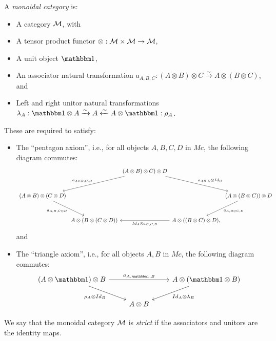 \begin{dfn}
	A \emph{monoidal category} is:
	\begin{itemize}
		\item A category $\mathcal{M}$, with
		\item A tensor product functor $\otimes: \mathcal{M} \times \mathcal{M} \to \mathcal{M}$,
		\item A unit object $\onebb$,
		\item An associator natural transformation $a_{A,B,C}:(A \otimes B) \otimes C \xrightarrow{\sim} A \otimes (B \otimes C)$, and
		\item Left and right unitor natural transformations $\lambda_A:\onebb \otimes A \xrightarrow{\sim} A \xleftarrow{\sim} A \otimes \onebb:\rho_A$.
	\end{itemize}
	These are required to satisfy:
	\begin{itemize}
		\item The ``pentagon axiom'', i.e., for all objects $A,B,C,D$ in $Mc$, the following diagram commutes:
		\begin{equation*}
            \begin{tikzcd}[column sep=0ex, row sep = large]
                &&(A\otimes B)\otimes C)\otimes D \arrow[dll, "a_{A\otimes B,C,D}"'] \arrow[drr, "a_{A B,C}\otimes Id_D"] \\
                (A\otimes B)\otimes(C\otimes D)\arrow[dr, "a_{A,B,C\otimes D}"']
                &&&&(A\otimes(B\otimes C))\otimes D \arrow[dl, "a_{A,B\otimes C,D}"] \\
                &A\otimes (B\otimes(C\otimes D))
                &&A\otimes ((B\otimes C)\otimes D)\arrow[ll, "Id_A\otimes a_{B,C,D}"],
            \end{tikzcd}
        \end{equation*}		
		and
		\item The ``triangle axiom'', i.e., for all objects $A,B$ in $Mc$, the following diagram commutes:
		\begin{equation*}
			\begin{tikzcd}
				(A\otimes \onebb)\otimes B \arrow[rr, "a_{A,\onebb,B}"] \arrow[dr, "\rho_A\otimes Id_B"']
				&&A\otimes (\onebb\otimes B) \arrow[dl, "Id_A\otimes\lambda_B"]\\
				&A\otimes B
			\end{tikzcd}
		\end{equation*}
	\end{itemize}
	We say that the monoidal category $\mathcal{M}$ is \emph{strict} if the associators and unitors are the identity maps.
\end{dfn}

